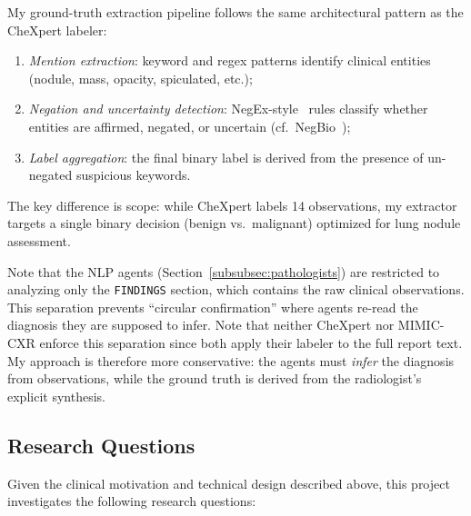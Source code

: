 \documentclass[12pt]{article}
\begin{document}
My ground-truth extraction pipeline follows the same architectural pattern as the CheXpert labeler:
\begin{enumerate}
    \item \emph{Mention extraction}: keyword and regex patterns identify clinical entities (nodule, mass, opacity, spiculated, etc.);
    \item \emph{Negation and uncertainty detection}: NegEx-style~\cite{chapman2001negex} rules classify whether entities are affirmed, negated, or uncertain (cf.\ NegBio~\cite{peng2018negbio});
    \item \emph{Label aggregation}: the final binary label is derived from the presence of un-negated suspicious keywords.
\end{enumerate}
The key difference is scope: while CheXpert labels 14 observations, my extractor targets a single binary decision (benign vs.\ malignant) optimized for lung nodule assessment.

Note that the NLP agents (Section~\ref{subsubsec:pathologists}) are restricted to analyzing only the \texttt{FINDINGS} section, which contains the raw clinical observations. This separation prevents ``circular confirmation'' where agents re-read the diagnosis they are supposed to infer. Note that neither CheXpert nor MIMIC-CXR enforce this separation since both apply their labeler to the full report text. My approach is therefore more conservative: the agents must \emph{infer} the diagnosis from observations, while the ground truth is derived from the radiologist's explicit synthesis.

\subsection{Research Questions}
\label{subsec:research-questions}

Given the clinical motivation and technical design described above, this project investigates the following research questions:
\end{document}
